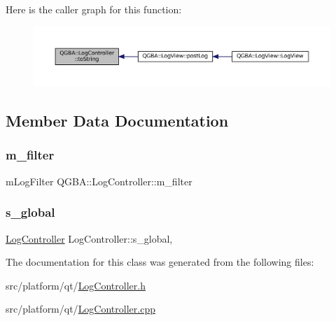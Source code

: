 Here is the caller graph for this function\+:
\nopagebreak
\begin{figure}[H]
\begin{center}
\leavevmode
\includegraphics[width=350pt]{class_q_g_b_a_1_1_log_controller_af48bd4df0f5b8be07c701da6857e16c1_icgraph}
\end{center}
\end{figure}


\subsection{Member Data Documentation}
\mbox{\label{class_q_g_b_a_1_1_log_controller_a0be8081cfe700b8180e9de59d2254552}} 
\subsubsection{\texorpdfstring{m\+\_\+filter}{m\_filter}}
{\footnotesize\ttfamily m\+Log\+Filter Q\+G\+B\+A\+::\+Log\+Controller\+::m\+\_\+filter\hspace{0.3cm}{\ttfamily [private]}}

\mbox{\label{class_q_g_b_a_1_1_log_controller_ab76d2c8bb8da22bd080aa178aac809a6}} 
\subsubsection{\texorpdfstring{s\+\_\+global}{s\_global}}
{\footnotesize\ttfamily \mbox{\hyperlink{class_q_g_b_a_1_1_log_controller}{Log\+Controller}} Log\+Controller\+::s\+\_\+global\hspace{0.3cm}{\ttfamily [static]}, {\ttfamily [private]}}



The documentation for this class was generated from the following files\+:\begin{DoxyCompactItemize}
\item 
src/platform/qt/\mbox{\hyperlink{_log_controller_8h}{Log\+Controller.\+h}}\item 
src/platform/qt/\mbox{\hyperlink{_log_controller_8cpp}{Log\+Controller.\+cpp}}\end{DoxyCompactItemize}
